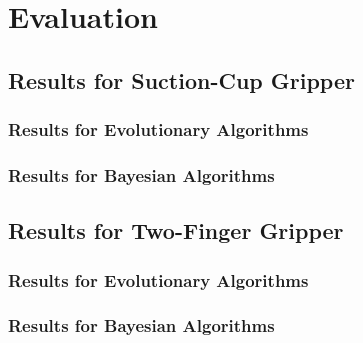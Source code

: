 \chapter{Evaluation}
\label{sec:evaluation}

\section{Results for Suction-Cup Gripper}
\subsection{Results for Evolutionary Algorithms}
\subsection{Results for Bayesian Algorithms}

\section{Results for Two-Finger Gripper}
\subsection{Results for Evolutionary Algorithms}
\subsection{Results for Bayesian Algorithms}